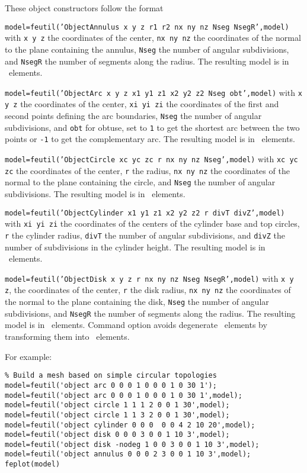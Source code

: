 
These object constructors follow the format

{\tt model=feutil('ObjectAnnulus x y z r1 r2 nx ny nz Nseg NsegR',model)}
with {\tt x y z} the coordinates of the center, {\tt nx ny nz} the coordinates of the normal to the plane containing the annulus, {\tt Nseg} the number of angular subdivisions, and {\tt NsegR} the number of segments along the radius. The resulting model is in \quada\ elements.

{\tt model=feutil('ObjectArc x y z x1 y1 z1 x2 y2 z2 Nseg obt',model)}
with {\tt x y z} the coordinates of the center, {\tt xi yi zi} the coordinates of the first and second points defining the arc boundaries, {\tt Nseg} the number of angular subdivisions, and {\tt obt} for obtuse, set to {\tt 1} to get the shortest arc between the two points or {\tt -1} to get the complementary arc. The resulting model is in \beam\ elements.

{\tt model=feutil('ObjectCircle xc yc zc r nx ny nz Nseg',model)}
with {\tt xc yc zc} the coordinates of the center, {\tt r} the radius, {\tt nx ny nz} the coordinates of the normal to the plane containing the circle, and {\tt Nseg} the number of angular subdivisions. The resulting model is in \beam\ elements.

{\tt model=feutil('ObjectCylinder x1 y1 z1 x2 y2 z2 r divT divZ',model)}
with {\tt xi yi zi} the coordinates of the centers of the cylinder base and top circles, {\tt r} the cylinder radius, {\tt divT} the number of angular subdivisions, and {\tt divZ} the number of subdivisions in the cylinder height. The resulting model is in \quada\ elements.

{\tt model=feutil('ObjectDisk x y z r nx ny nz Nseg NsegR',model)}
with {\tt x y z}, the coordinates of the center, {\tt r} the disk radius, {\tt nx ny nz} the coordinates of the normal to the plane containing the disk, {\tt Nseg} the number of angular subdivisions, and {\tt NsegR} the number of segments along the radius. The resulting model is in \quada\ elements. Command option  avoids degenerate \quad\ elements by transforming them into \triaa\ elements.

For example:
\begin{verbatim}
% Build a mesh based on simple circular topologies
model=feutil('object arc 0 0 0 1 0 0 0 1 0 30 1');
model=feutil('object arc 0 0 0 1 0 0 0 1 0 30 1',model);
model=feutil('object circle 1 1 1 2 0 0 1 30',model);
model=feutil('object circle 1 1 3 2 0 0 1 30',model);
model=feutil('object cylinder 0 0 0  0 0 4 2 10 20',model);
model=feutil('object disk 0 0 0 3 0 0 1 10 3',model);
model=feutil('object disk -nodeg 1 0 0 3 0 0 1 10 3',model);
model=feutil('object annulus 0 0 0 2 3 0 0 1 10 3',model);
feplot(model)
\end{verbatim}%


